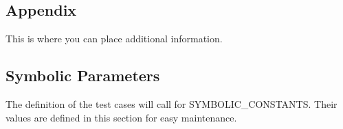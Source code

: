 \documentclass[12pt, titlepage]{article}
\begin{document}
\begin{enumerate}
\begin{comment}
\item{test-id1\\}

Type: \wss{Functional, Dynamic, Manual, Automatic, Static etc. Most will
  be automatic}
					
Initial State: 
					
Input/Condition: 
					
Output/Result: 
					
How test will be performed: 
					
\item{test-id2\\}

Type: Functional, Dynamic, Manual, Static etc.
					
Initial State: 
					
Input: 
					
Output: 
					
How test will be performed: 

\end{enumerate}

\subsubsection{Module ?}

...

\subsection{Traceability Between Test Cases and Modules}

\wss{Provide evidence that all of the modules have been considered.}

\end{comment}

\printbibliography



\newpage

\section{Appendix}

This is where you can place additional information.

\subsection{Symbolic Parameters}

The definition of the test cases will call for SYMBOLIC\_CONSTANTS.
Their values are defined in this section for easy maintenance.


\end{enumerate}
\end{document}
